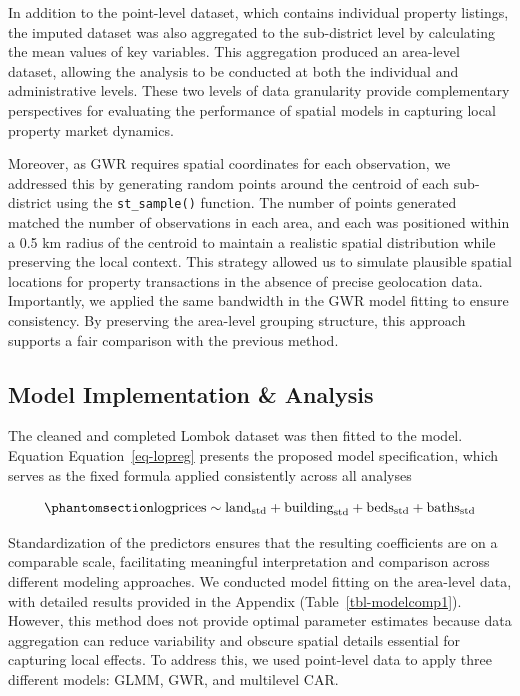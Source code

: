 \documentclass[
  default,
]{sn-jnl}
\begin{document}
In addition to the point-level dataset, which contains individual
property listings, the imputed dataset was also aggregated to the
sub-district level by calculating the mean values of key variables. This
aggregation produced an area-level dataset, allowing the analysis to be
conducted at both the individual and administrative levels. These two
levels of data granularity provide complementary perspectives for
evaluating the performance of spatial models in capturing local property
market dynamics.

Moreover, as GWR requires spatial coordinates for each observation, we
addressed this by generating random points around the centroid of each
sub-district using the \texttt{st\_sample()} function. The number of
points generated matched the number of observations in each area, and
each was positioned within a 0.5 km radius of the centroid to maintain a
realistic spatial distribution while preserving the local context. This
strategy allowed us to simulate plausible spatial locations for property
transactions in the absence of precise geolocation data. Importantly, we
applied the same bandwidth in the GWR model fitting to ensure
consistency. By preserving the area-level grouping structure, this
approach supports a fair comparison with the previous method.

\subsection{Model Implementation \&
Analysis}\label{model-implementation-analysis}

The cleaned and completed Lombok dataset was then fitted to the model.
Equation Equation~\ref{eq-lopreg} presents the proposed model
specification, which serves as the fixed formula applied consistently
across all analyses

\begin{equation}\phantomsection\label{eq-lopreg}{
\text{logprices} \sim \text{land}_{\text{std}} + \text{building}_{\text{std}} + \text{beds}_{\text{std}} + \text{baths}_{\text{std}}
}\end{equation}

Standardization of the predictors ensures that the resulting
coefficients are on a comparable scale, facilitating meaningful
interpretation and comparison across different modeling approaches. We
conducted model fitting on the area-level data, with detailed results
provided in the Appendix (Table~\ref{tbl-modelcomp1}). However, this
method does not provide optimal parameter estimates because data
aggregation can reduce variability and obscure spatial details essential
for capturing local effects. To address this, we used point-level data
to apply three different models: GLMM, GWR, and multilevel CAR.
\end{document}
